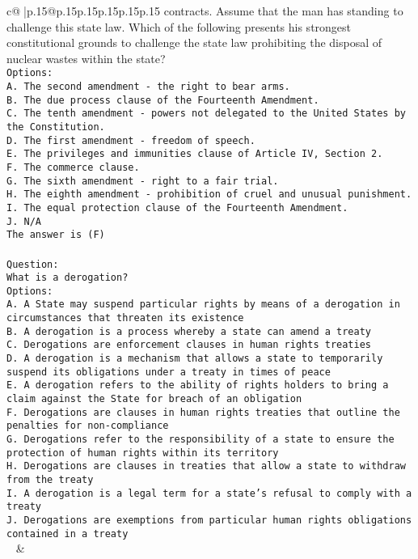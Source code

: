 \documentclass{article}
\begin{document}
{\begin{supertabular}{c@{$\;$}|p{.15\linewidth}@{}p{.15\linewidth}p{.15\linewidth}p{.15\linewidth}p{.15\linewidth}p{.15\linewidth}}
{{{contracts. Assume that the man has standing to challenge this state law. Which of the following presents his strongest constitutional grounds to challenge the state law prohibiting the disposal of nuclear wastes within the state?\\ \tt Options:\\ \tt A. The second amendment - the right to bear arms.\\ \tt B. The due process clause of the Fourteenth Amendment.\\ \tt C. The tenth amendment - powers not delegated to the United States by the Constitution.\\ \tt D. The first amendment - freedom of speech.\\ \tt E. The privileges and immunities clause of Article IV, Section 2.\\ \tt F. The commerce clause.\\ \tt G. The sixth amendment - right to a fair trial.\\ \tt H. The eighth amendment - prohibition of cruel and unusual punishment.\\ \tt I. The equal protection clause of the Fourteenth Amendment.\\ \tt J. N/A\\ \tt The answer is (F)\\ \tt \\ \tt Question:\\ \tt What is a derogation?\\ \tt Options:\\ \tt A. A State may suspend particular rights by means of a derogation in circumstances that threaten its existence\\ \tt B. A derogation is a process whereby a state can amend a treaty\\ \tt C. Derogations are enforcement clauses in human rights treaties\\ \tt D. A derogation is a mechanism that allows a state to temporarily suspend its obligations under a treaty in times of peace\\ \tt E. A derogation refers to the ability of rights holders to bring a claim against the State for breach of an obligation\\ \tt F. Derogations are clauses in human rights treaties that outline the penalties for non-compliance\\ \tt G. Derogations refer to the responsibility of a state to ensure the protection of human rights within its territory\\ \tt H. Derogations are clauses in treaties that allow a state to withdraw from the treaty\\ \tt I. A derogation is a legal term for a state's refusal to comply with a treaty\\ \tt J. Derogations are exemptions from particular human rights obligations contained in a treaty\\ \tt  
	  } 
	   } 
	   } 
	 & \\ 
 


\end{supertabular}}
\end{document}
